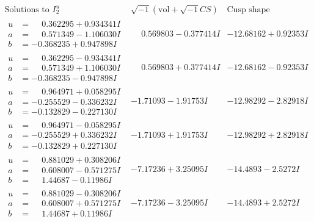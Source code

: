 \documentclass[1p]{elsarticle_modified}
\theoremstyle{definition}
\newcommand{\I}{\sqrt{-1}}
\begin{document}
$$\begin{array}{c|c|c}  
\text{Solutions to }I^u_{2}& \I (\text{vol} + \sqrt{-1}CS) & \text{Cusp shape}\\
 \hline 
\begin{aligned}
u &= \phantom{-}0.362295 + 0.934341 I \\
a &= \phantom{-}0.571349 - 1.106030 I \\
b &= -0.368235 + 0.947898 I\end{aligned}
 & \phantom{-}0.569803 - 0.377414 I & -12.68162 + 0.92353 I \\ \hline\begin{aligned}
u &= \phantom{-}0.362295 - 0.934341 I \\
a &= \phantom{-}0.571349 + 1.106030 I \\
b &= -0.368235 - 0.947898 I\end{aligned}
 & \phantom{-}0.569803 + 0.377414 I & -12.68162 - 0.92353 I \\ \hline\begin{aligned}
u &= \phantom{-}0.964971 + 0.058295 I \\
a &= -0.255529 - 0.336232 I \\
b &= -0.132829 - 0.227130 I\end{aligned}
 & -1.71093 - 1.91753 I & -12.98292 - 2.82918 I \\ \hline\begin{aligned}
u &= \phantom{-}0.964971 - 0.058295 I \\
a &= -0.255529 + 0.336232 I \\
b &= -0.132829 + 0.227130 I\end{aligned}
 & -1.71093 + 1.91753 I & -12.98292 + 2.82918 I \\ \hline\begin{aligned}
u &= \phantom{-}0.881029 + 0.308206 I \\
a &= \phantom{-}0.608007 - 0.571275 I \\
b &= \phantom{-}1.44687 - 0.11986 I\end{aligned}
 & -7.17236 + 3.25095 I & -14.4893 - 2.5272 I \\ \hline\begin{aligned}
u &= \phantom{-}0.881029 - 0.308206 I \\
a &= \phantom{-}0.608007 + 0.571275 I \\
b &= \phantom{-}1.44687 + 0.11986 I\end{aligned}
 & -7.17236 - 3.25095 I & -14.4893 + 2.5272 I \\ \hline\begin{aligned}

\end{aligned}
\end{array}$$
\end{document}

